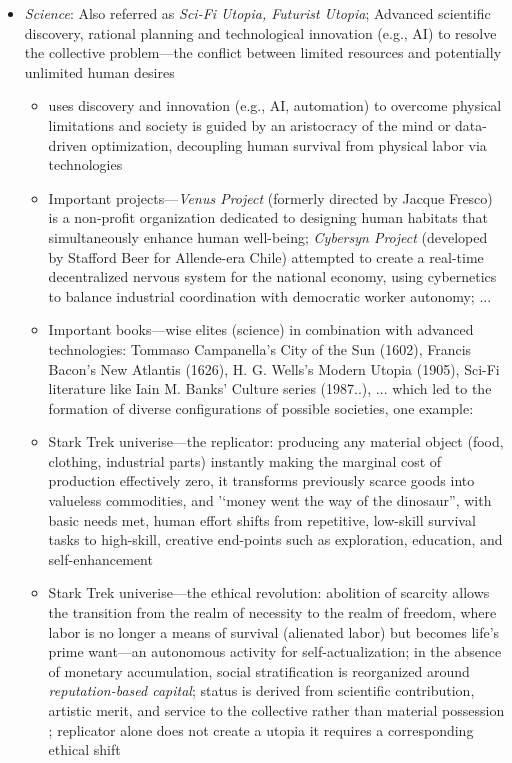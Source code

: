 \documentclass[jou,floatsintext]{apa7}
\begin{document}
\begin{itemize}
\begin{itemize}
    \item \textit{Science}: Also referred as \textit{Sci-Fi Utopia, Futurist Utopia}; Advanced scientific discovery, rational planning and technological innovation (e.g., AI) to resolve the collective problem---the conflict between limited resources and potentially unlimited human desires \parencite{fernandoGreensSpaceInvaders2020, kashimaCollectiveFutureThinking2025}
    \begin{itemize}
        \item uses discovery and innovation (e.g., AI, automation) to overcome physical limitations and society is guided by an aristocracy of the mind or data-driven optimization, decoupling human survival from physical labor via technologies \parencite{kashimaCollectiveFutureThinking2025, wojewodaARTIFICIALINTELLIGENCESOCIAL2023}
        \item Important projects---\textit{Venus Project} (formerly directed by Jacque Fresco) is a non-profit organization dedicated to designing human habitats that simultaneously enhance human well-being; \textit{Cybersyn Project} (developed by Stafford Beer for Allende-era Chile) attempted to create a real-time decentralized nervous system for the national economy, using cybernetics to balance industrial coordination with democratic worker autonomy; ...
        \item Important books---wise elites (science) in combination with advanced technologies: Tommaso Campanella’s City of the Sun (1602), Francis Bacon’s New Atlantis (1626), H. G. Wells’s  Modern Utopia (1905),  Sci-Fi literature like Iain M. Banks’ Culture series (1987..), ... which led to the formation of diverse configurations of possible societies, one example:
        \item[$\rightarrow$] Stark Trek univerise---the replicator: producing any material object (food, clothing, industrial parts) instantly making the marginal cost of production effectively zero, it transforms previously scarce goods into valueless commodities, and '‘money went the way of the dinosaur'', with basic needs met, human effort shifts from repetitive, low-skill survival tasks to high-skill, creative end-points such as exploration, education, and self-enhancement \parencite{grechStarTreksFederation2015, saadiaTrekonomicsEconomicsStar2016}
        \item[$\rightarrow$] Stark Trek univerise---the ethical revolution: abolition of scarcity allows the transition from the realm of necessity to the realm of freedom, where labor is no longer a means of survival (alienated labor) but becomes life's prime want---an autonomous activity for self-actualization; in the absence of monetary accumulation, social stratification is reorganized around \textit{reputation-based capital}; status is derived from scientific contribution, artistic merit, and service to the collective rather than material possession \parencite{kremserWirtschaftSTARTREK2023}; replicator alone does not create a utopia it requires a corresponding ethical shift \parencite{grechStarTreksFederation2015}

\end{itemize}
\end{itemize}
\end{itemize}
\end{document}
